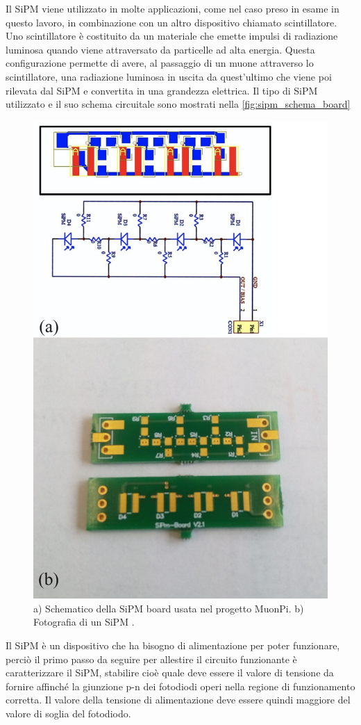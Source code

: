 Il SiPM viene utilizzato in molte applicazioni, come nel caso preso in esame in questo lavoro, in combinazione con un altro dispositivo 
chiamato scintillatore. Uno scintillatore è costituito da un materiale che emette impulsi di radiazione luminosa quando viene attraversato da 
particelle ad alta energia.
Questa configurazione permette di avere, al passaggio di un muone attraverso lo scintillatore, una radiazione luminosa in uscita da quest'ultimo 
che viene poi rilevata dal SiPM e convertita in una grandezza elettrica. Il tipo di SiPM utilizzato e il suo schema circuitale sono mostrati nella \autoref*{fig:sipm_schema_board}
\begin{figure}[h!]
    \centering
    \includegraphics[width=.75\linewidth]{img/sipm_schema+board.jpg}
    \caption{a) Schematico della SiPM board usata nel progetto MuonPi. b) Fotografia di un SiPM \cite{muonpiwikicontributors_2017_sipm}.}
    \label{fig:sipm_schema_board}
\end{figure}

Il SiPM è un dispositivo che ha bisogno di alimentazione per poter funzionare, perciò il primo passo da seguire per allestire 
il circuito funzionante è caratterizzare il SiPM, stabilire cioè quale deve essere il valore di tensione da fornire affinché la giunzione p-n dei
fotodiodi operi nella regione di funzionamento corretta. Il valore della tensione di alimentazione deve essere quindi maggiore del valore di soglia 
del fotodiodo.
